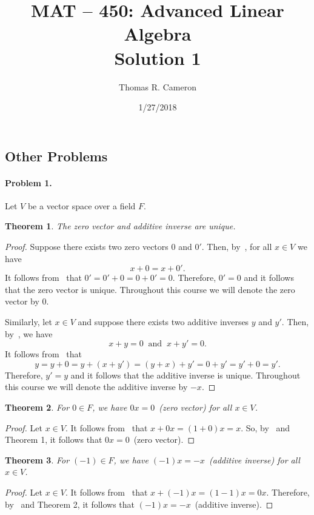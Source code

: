 \documentclass{article}
\title{MAT -- 450: Advanced Linear Algebra\\
\large{Solution 1}}
\author{Thomas R. Cameron}
\date{1/27/2018}
\newtheorem{theorem}{Theorem}
\begin{document}
\maketitle

\subsection*{Other Problems}

\paragraph*{Problem 1.}	Let $V$ be a vector space over a field $F$. 
\begin{theorem}
The zero vector and additive inverse are unique.
\end{theorem}
\begin{proof}
Suppose there exists two zero vectors $0$ and $0'$. Then, by~\cite[VS 3]{Friedberg}, for all $x\in V$ we have
\[
x+0 = x+0'.
\]
It follows from~\cite[VS 1]{Friedberg} that $0'=0'+0=0+0'=0$. Therefore, $0'=0$ and it follows that the zero vector is unique. Throughout this course we will denote the zero vector by $0$. 

Similarly, let $x\in V$ and suppose there exists two additive inverses $y$ and $y'$. Then, by~\cite[VS 4]{Friedberg}, we have
\[
x+y=0~\text{ and }~x+y'=0.
\]
It follows from~\cite[VS 1 and VS 2]{Friedberg} that 
\[
y=y+0=y+(x+y')=(y+x)+y'=0+y'=y'+0=y'.
\]
Therefore, $y'=y$ and it follows that the additive inverse is unique. Throughout this course we will denote the additive inverse by $-x$. 
\end{proof}

\begin{theorem}
For $0\in F$, we have $0x=0$~(zero vector) for all $x\in V$. 
\end{theorem}
\begin{proof}
Let $x\in V$. It follows from~\cite[VS 8]{Friedberg} that $x+0x=(1+0)x=x$. So, by~\cite[VS 3]{Friedberg} and Theorem 1, it follows that $0x=0$~(zero vector). 
\end{proof}

\begin{theorem}
For $(-1)\in F$, we have $(-1)x=-x$~(additive inverse) for all $x\in V$. 
\end{theorem}
\begin{proof}
Let $x\in V$. It follows from~\cite[VS 8]{Friedberg} that $x+(-1)x=(1-1)x=0x$. Therefore, by~\cite[VS 4]{Friedberg} and Theorem 2, it follows that $(-1)x=-x$~(additive inverse). 
\end{proof}
\end{document}
